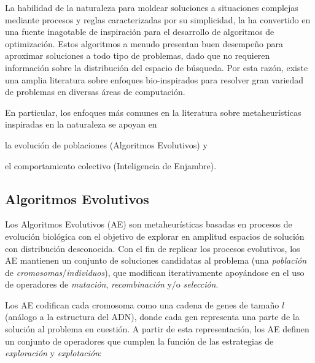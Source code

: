 La habilidad de la naturaleza para moldear soluciones a situaciones complejas mediante procesos y reglas caracterizadas por su simplicidad, la ha convertido en una fuente inagotable de inspiración para el desarrollo de algoritmos de optimización. Estos algoritmos a menudo presentan buen desempeño para aproximar soluciones a todo tipo de problemas, dado que no requieren información sobre la distribución del espacio de búsqueda. Por esta razón, existe una amplia literatura sobre enfoques bio-inspirados \cite{binitha2012survey} para resolver gran variedad de problemas en diversas áreas de computación.

En particular, los enfoques más comunes en la literatura sobre metaheurísticas inspiradas en la naturaleza se apoyan en
\begin{inparaenum}
\item la evolución de poblaciones (Algoritmos Evolutivos) y
\item el comportamiento colectivo (Inteligencia de Enjambre).
\end{inparaenum}

\subsection{Algoritmos Evolutivos}

Los Algoritmos Evolutivos (AE) son metaheurísticas basadas en procesos de evolución biológica con el objetivo de explorar en amplitud espacios de solución con distribución desconocida. Con el fin de replicar los procesos evolutivos, los AE mantienen un conjunto de soluciones candidatas al problema (una \emph{población} de \emph{cromosomas}/\emph{individuos}), que modifican iterativamente apoyándose en el uso de operadores de \emph{mutación}, \emph{recombinación} y/o \emph{selección}.

Los AE codifican cada cromosoma como una cadena de genes de tamaño $l$ (análogo a la estructura del ADN), donde cada gen representa una parte de la solución al problema en cuestión. A partir de esta representación, los AE definen un conjunto de operadores que cumplen la función de las estrategias de \emph{exploración} y \emph{explotación}:


